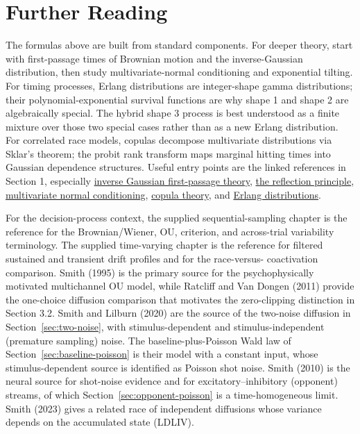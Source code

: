 \documentclass[12pt]{article}
\begin{document}
\section{Further Reading}
The formulas above are built from standard components. For deeper theory, start with first-passage times of Brownian motion and the inverse-Gaussian distribution, then study multivariate-normal conditioning and exponential tilting. For timing processes, Erlang distributions are integer-shape gamma distributions; their polynomial-exponential survival functions are why shape 1 and shape 2 are algebraically special. The hybrid shape 3 process is best understood as a finite mixture over those two special cases rather than as a new Erlang distribution. For correlated race models, copulas decompose multivariate distributions via Sklar's theorem; the probit rank transform maps marginal hitting times into Gaussian dependence structures. Useful entry points are the linked references in Section 1, especially \href{https://en.wikipedia.org/wiki/Inverse_Gaussian_distribution}{inverse Gaussian first-passage theory}, \href{https://en.wikipedia.org/wiki/Reflection_principle_(Wiener_process)}{the reflection principle}, \href{https://en.wikipedia.org/wiki/Multivariate_normal_distribution}{multivariate normal conditioning}, \href{https://en.wikipedia.org/wiki/Copula_(probability_theory)}{copula theory}, and \href{https://mathworld.wolfram.com/ErlangDistribution.html}{Erlang distributions}.

For the decision-process context, the supplied sequential-sampling chapter is the reference for the Brownian/Wiener, OU, criterion, and across-trial variability terminology. The supplied time-varying chapter is the reference for filtered sustained and transient drift profiles and for the race-versus- coactivation comparison. Smith (1995) is the primary source for the psychophysically motivated multichannel OU model, while Ratcliff and Van Dongen (2011) provide the one-choice diffusion comparison that motivates the zero-clipping distinction in Section 3.2. Smith and Lilburn (2020) are the source of the two-noise diffusion in Section~\ref{sec:two-noise}, with stimulus-dependent and stimulus-independent (premature sampling) noise. The baseline-plus-Poisson Wald law of Section~\ref{sec:baseline-poisson} is their model with a constant input, whose stimulus-dependent source is identified as Poisson shot noise. Smith (2010) is the neural source for shot-noise evidence and for excitatory--inhibitory (opponent) streams, of which Section~\ref{sec:opponent-poisson} is a time-homogeneous limit. Smith (2023) gives a related race of independent diffusions whose variance depends on the accumulated state (LDLIV).
\end{document}

